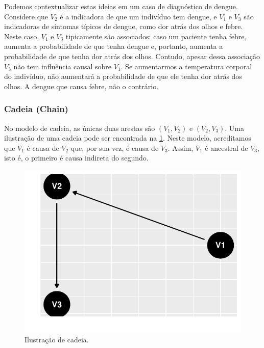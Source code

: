 Podemos contextualizar estas ideias
em um caso de diagnóstico de dengue.
Considere que 
$V_2$ é a indicadora de que um indivíduo tem dengue, e
$V_1$ e $V_3$ são indicadoras de sintomas típicos de dengue, como
dor atrás dos olhos e febre.
Neste caso, $V_1$ e $V_3$ tipicamente são associados:
caso um paciente tenha febre,
aumenta a probabilidade de que tenha dengue e, portanto,
aumenta a probabilidade de que tenha dor atrás dos olhos.
Contudo, apesar dessa associação 
$V_3$ não tem influência causal sobre $V_1$.
Se aumentarmos a temperatura corporal do indivíduo,
não aumentará a probabilidade de que ele tenha dor atrás dos olhos.
A dengue que causa febre, não o contrário.

\subsubsection{Cadeia (Chain)}

No modelo de cadeia, 
as únicas duas arestas são 
$(V_1, V_2)$ e $(V_2, V_3)$.
Uma ilustração de uma cadeia
pode ser encontrada 
na \cref{fig:cadeia}.
Neste modelo, acreditamos que 
$V_1$ é causa de $V_2$ que,
por sua vez, é causa de $V_3$.
Assim, $V_1$ é ancestral de $V_3$,
isto é, o primeiro é 
causa indireta do segundo.


\begin{knitrout}
\color{fgcolor}\begin{figure}[t]

{\centering \includegraphics[width=\maxwidth]{./figures/cadeia-1} 

}

\caption[Ilustração de cadeia]{Ilustração de cadeia.}\label{fig:cadeia}
\end{figure}

\end{knitrout}

